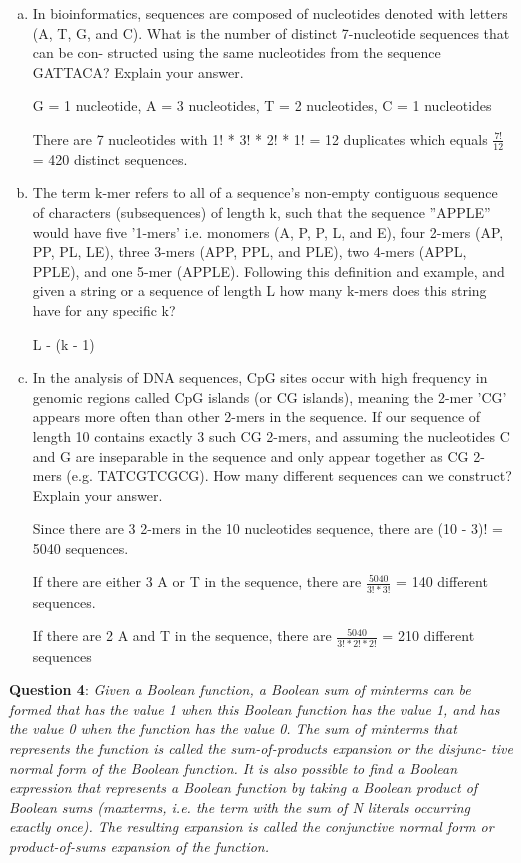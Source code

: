 \documentclass{article} %
\newcommand{\question}[2][]{\begin{flushleft}
        \textbf{Question #1}: \textit{#2}

\end{flushleft}}
\begin{document}
    \begin{enumerate}[(a)]
      \item {In bioinformatics, sequences are composed of nucleotides denoted
      with letters (A, T, G, and C). What is the number of distinct 7-nucleotide sequences that can be con-
      structed using the same nucleotides from the sequence GATTACA? Explain your answer.}

      G = 1 nucleotide, A = 3 nucleotides, T = 2 nucleotides, C = 1 nucleotides

      There are 7 nucleotides with 1! * 3! * 2! * 1! = 12 duplicates which equals $\frac{7!}{12}$ = 420 distinct sequences.
      \item {The term k-mer refers to all of a sequence’s non-empty contiguous sequence of characters
      (subsequences) of length k, such that the sequence ”APPLE” would have five ’1-mers’ i.e. monomers (A,
      P, P, L, and E), four 2-mers (AP, PP, PL, LE), three 3-mers (APP, PPL, and PLE), two 4-mers (APPL,
      PPLE), and one 5-mer (APPLE). Following this definition and example, and given a string or a sequence
      of length L how many k-mers does this string have for any specific k?}

      L - (k - 1)

      \item {In the analysis of DNA sequences, CpG sites occur with high frequency in genomic regions
      called CpG islands (or CG islands), meaning the 2-mer ’CG’ appears more often than other 2-mers in the
      sequence. If our sequence of length 10 contains exactly 3 such CG 2-mers, and assuming the nucleotides
      C and G are inseparable in the sequence and only appear together as CG 2-mers (e.g. TATCGTCGCG).
      How many different sequences can we construct? Explain your answer.}

      Since there are 3 2-mers in the 10 nucleotides sequence, there are (10 - 3)! = 5040 sequences.

      If there are either 3 A or T in the sequence, there are $\frac{5040}{3!*3!}$ = 140 different sequences.

      If there are 2 A and T in the sequence, there are $\frac{5040}{3!*2!*2!}$ = 210 different sequences
    \end{enumerate}

    \question[4]{Given a Boolean function, a Boolean sum of minterms can be formed that has
    the value 1 when this Boolean function has the value 1, and has the value 0 when the function has the
    value 0.
    The sum of minterms that represents the function is called the sum-of-products expansion or the disjunc-
    tive normal form of the Boolean function.
    It is also possible to find a Boolean expression that represents a Boolean function by taking a Boolean
    product of Boolean sums (maxterms, i.e. the term with the sum of N literals occurring exactly once). The
    resulting expansion is called the conjunctive normal form or product-of-sums expansion of the function.}
\end{document}
